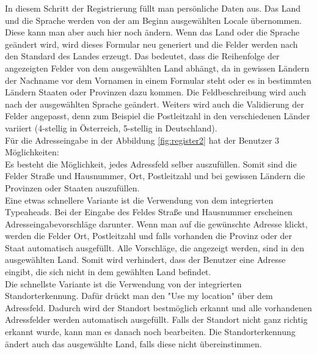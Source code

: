 In diesem Schritt der Registrierung füllt man persönliche Daten aus. Das Land und die Sprache werden von der am Beginn ausgewählten Locale übernommen. Diese kann man aber auch hier noch ändern. Wenn das Land oder die Sprache geändert wird, wird dieses Formular neu generiert und die Felder werden nach den Standard des Landes erzeugt. Das bedeutet, dass die Reihenfolge der angezeigten Felder von dem ausgewählten Land abhängt, da in gewissen Ländern der Nachname vor dem Vornamen in einem Formular steht oder es in bestimmten Ländern Staaten oder Provinzen dazu kommen. Die Feldbeschreibung wird auch nach der ausgewählten Sprache geändert. Weiters wird auch die Validierung der Felder angepasst, denn zum Beispiel die Postleitzahl in den verschiedenen Länder variiert (4-stellig in Österreich, 5-stellig in Deutschland). \\
Für die Adresseingabe in der Abbildung \ref{fig:register2} hat der Benutzer 3 Möglichkeiten:\\
Es besteht die Möglichkeit, jedes Adressfeld selber auszufüllen. Somit sind die Felder Straße und Hausnummer, Ort, Postleitzahl und bei gewissen Ländern die Provinzen oder Staaten auszufüllen.\\
Eine etwas schnellere Variante ist die Verwendung von dem integrierten Typeaheads. Bei der Eingabe des Feldes Straße und Hausnummer erscheinen Adresseingabevorschläge darunter. Wenn man auf die gewünschte Adresse klickt, werden die Felder Ort, Postleitzahl und falls vorhanden die Provinz oder der Staat automatisch ausgefüllt. Alle Vorschläge, die angezeigt werden, sind in den ausgewählten Land. Somit wird verhindert, dass der Benutzer eine Adresse eingibt, die sich nicht in dem gewählten Land befindet.\\
Die schnellste Variante ist die Verwendung von der integrierten Standorterkennung. Dafür drückt man den "Use my location" über dem Adressfeld. Dadurch wird der Standort bestmöglich erkannt und alle vorhandenen Adressfelder werden automatisch ausgefüllt. Falls der Standort nicht ganz richtig erkannt wurde, kann man es danach noch bearbeiten. Die Standorterkennung ändert auch das ausgewählte Land, falls diese nicht übereinstimmen.
